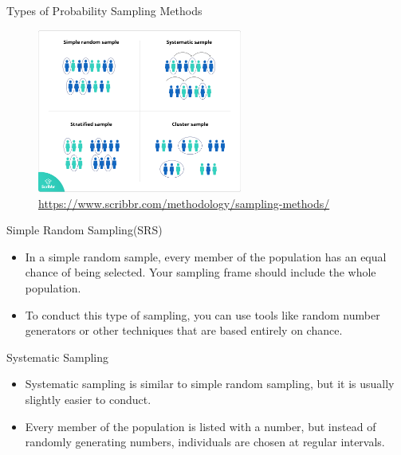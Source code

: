 \documentclass[10pt,dvipsnames, aspectratio=169]{beamer}
\begin{document}
\begin{frame}[t]{Types of Probability Sampling Methods}
	\begin{figure} [ht]
		\centering
		\includegraphics[width=0.6\textwidth]{rp/sampling.png}
		\caption{\url{https://www.scribbr.com/methodology/sampling-methods/}}
	\end{figure}
\end{frame}


\begin{frame}[t]{Simple Random Sampling(SRS)}
	\begin{itemize}
		\item In a simple random sample, every member of the population has an 
		equal chance of being selected. Your sampling frame should include the 
		whole population.
		\item To conduct this type of sampling, you can use tools like random 
		number generators or other techniques that are based entirely on chance.
	\end{itemize}
\end{frame}
\begin{frame}[t]{Systematic Sampling}
	\begin{itemize}
		\item Systematic sampling is similar to simple random sampling, but it 
		is usually slightly easier to conduct.
		\item Every member of the population is listed with a number, but 
		instead of randomly generating numbers, individuals are chosen at 
		regular intervals.
	\end{itemize}
\end{frame}
\end{document}
